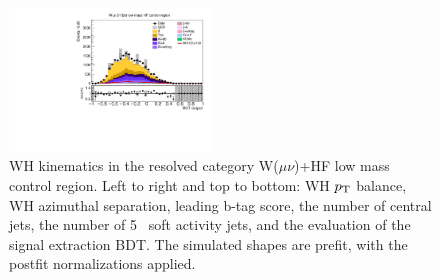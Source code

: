 \begin{figure}[tbp]
\begin{center}
    \includegraphics[width=0.48\textwidth]{figures/wlnhbb2016/resolved/WmnWHHeavyFlavorCRLowMass_bdtValue.pdf}
    \caption{WH kinematics in the resolved category W($\mu\nu$)+HF low mass control region.
    Left to right and top to bottom: WH $p_{\mathrm{T}}$ balance, WH azimuthal separation, leading b-tag score, the number of central jets,
    the number of 5 \GeV\ soft activity jets, and the evaluation of the signal extraction BDT.
    The simulated shapes are prefit, with the postfit normalizations applied.}
    \label{fig:res_WmnHFLowMass_WH}
  \end{center}
\end{figure}
\clearpage

